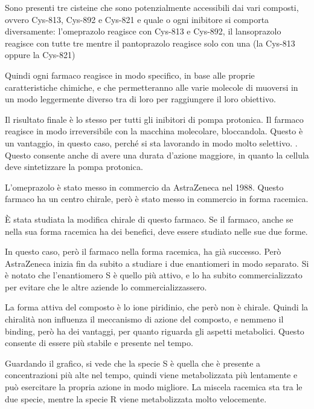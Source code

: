 
Sono presenti tre cisteine che sono potenzialmente accessibili dai vari
composti, ovvero Cys-813, Cys-892 e Cys-821 e quale o ogni inibitore si
comporta diversamente: l'omeprazolo reagisce con Cys-813 e Cys-892, il
lansoprazolo reagisce con tutte tre mentre il pantoprazolo reagisce solo
con una (la Cys-813 oppure la Cys-821)

Quindi ogni farmaco reagisce in modo specifico, in base alle proprie
caratteristiche chimiche, e che permetteranno alle varie molecole di
muoversi in un modo leggermente diverso tra di loro per raggiungere il
loro obiettivo.

Il risultato finale è lo stesso per tutti gli inibitori di pompa
protonica. Il farmaco reagisce in modo irreversibile con la macchina
molecolare, bloccandola. Questo è un vantaggio, in questo caso, perché
si sta lavorando in modo molto selettivo.
.
Questo consente anche di avere una durata d'azione maggiore, in quanto
la cellula deve sintetizzare la pompa protonica.


L'omeprazolo è stato messo in commercio da AstraZeneca nel 1988. Questo
farmaco ha un centro chirale, però è stato messo in commercio in forma
racemica.

È stata studiata la modifica chirale di questo farmaco. Se il farmaco,
anche se nella sua forma racemica ha dei benefici, deve essere studiato
nelle sue due forme.

In questo caso, però il farmaco nella forma racemica, ha già successo.
Però AstraZeneca inizia fin da subito a studiare i due enantiomeri in
modo separato. Si è notato che l'enantiomero S è quello più attivo, e lo
ha subito commercializzato per evitare che le altre aziende lo
commercializzassero.

La forma attiva del composto è lo ione piridinio, che però non è
chirale. Quindi la chiralità non influenza il meccanismo di azione del
composto, e nemmeno il binding, però ha dei vantaggi, per quanto
riguarda gli aspetti metabolici. Questo consente di essere più stabile e
presente nel tempo.


Guardando il grafico, si vede che la specie S è quella che è presente a
concentrazioni più alte nel tempo, quindi viene metabolizzata più
lentamente e può esercitare la propria azione in modo migliore. La
miscela racemica sta tra le due specie, mentre la specie R viene
metabolizzata molto velocemente.

